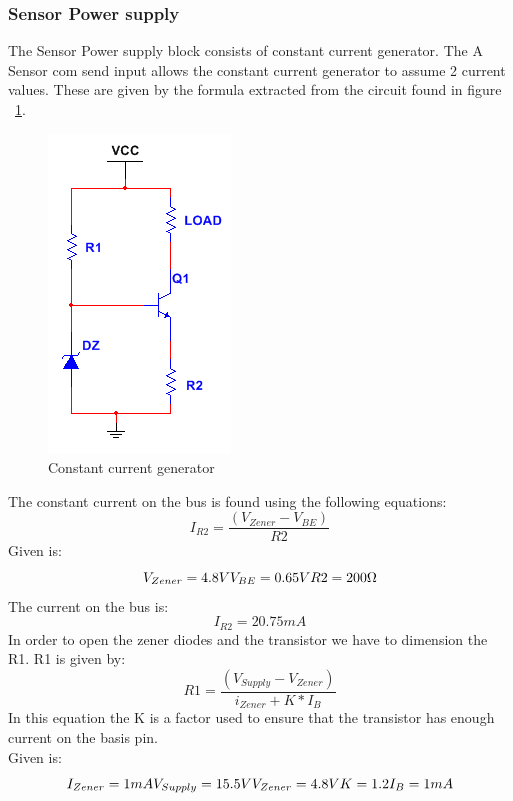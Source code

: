 \subsubsection{Sensor Power supply}
The Sensor Power supply block consists of constant current generator. The A Sensor com send input allows the constant current generator to assume 2 current values. These are given by the formula extracted from the circuit found in figure ~\ref{fig:ccg}.\\
\begin{figure}[H]
	\centering
	\includegraphics[scale=0.8]{billeder/ccg}
	\caption{Constant current generator}
	\label{fig:ccg}
\end{figure}
The constant current on the bus is found using the following equations:
\begin{equation}
	I_{R2}= \frac{(V_{Zener}-V_{BE})}{R2}
\end{equation}
Given is:
\begin{equation}
	V_{Zener} = 4.8V $\\$
	V_{BE} = 0.65V $\\$
	R2 = 200\Omega
\end{equation}
The current on the bus is:
\begin{equation}
	I_{R2}= 20.75 mA
\end{equation}
In order to open the zener diodes and the transistor we have to dimension the R1. R1 is given by:
\begin{equation}
	R1= \frac{(V_{Supply}-V_{Zener})}{i_{Zener}+K * I_B}
\end{equation}
In this equation the K is a factor used to ensure that the transistor has enough current on the basis pin.\\
Given is:
\begin{equation}
	I_{Zener} = 1 mA $\\$
	V_{Supply} = 15.5V $\\$
	V_{Zener} = 4.8V $\\$
	K = 1.2 $\\$
	I_B = 1 mA
\end{equation}
